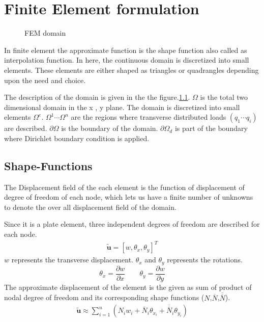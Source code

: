 \documentclass[main.tex]{subfiles}
\begin{document}
\chapter{Finite Element formulation}

\begin{figure}[h]
\centering

\caption{FEM domain}
\label{fig:fem_domain}
\end{figure}

In finite element the approximate function is the shape function also called as interpolation function. In here, the continuous domain is discretized into small elements. These elements are either shaped as triangles or quadrangles depending upon the need and choice.   

The description of the domain is given in the the figure.\ref{fig:fem_domain}.  $\Omega$ is the total two dimensional domain in the x , y plane. The domain is discretized into small elements $\Omega^e$. $\Omega^1 \cdots \Omega^n$ are the regions where transverse distributed loads $(q_1 \cdots q_i)$ are described. $\partial \Omega$ is the boundary of the domain. $\partial \Omega _ d$ is part of the boundary where Dirichlet boundary condition is applied. 
\section{Shape-Functions}

The Displacement field of the each element is the function of displacement of degree of freedom of each  node, which lets us have a finite number of unknowns to denote the over all displacement field of the domain. 

Since it is a plate element, three independent degrees of freedom are described for each node. 
\begin{equation*}
\begin{split}
\tilde{\mathbf{u}} = \left[ w, \theta_x , \theta_y  \right]^T
\end{split}
\end{equation*}
$w$ represents the transverse displacement. $\theta_x$ and $\theta_y$ represents the rotations. 
\begin{equation}
\theta_x =\frac{\partial w}{\partial x} \qquad
 \theta_y  =\frac{\partial w}{\partial y}
\end{equation}
The approximate displacement of the element is the given as sum of product of nodal degree of freedom and its corresponding shape functions ($N$,$\overline{N}$,$\overline{\overline{N}}$).
\begin{equation}\label{eq:approx_disp}
\begin{split}
\tilde{\mathbf{u}} \approx \sum_{i=1}^{n}\left(N_iw_i+\overline{N}_i\theta_{x_i} +\overline{\overline{N}}_i\theta_{y_i}\right)
\end{split}
\end{equation}
\end{document}
